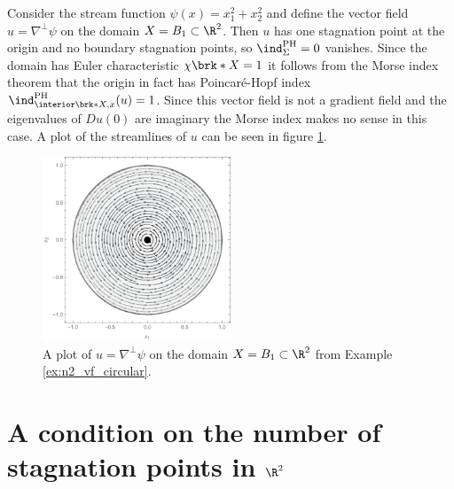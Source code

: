 \begin{example}\label{ex:n2_vf_circular}
  Consider the stream function $\psi(x)=x_1^2+x_2^2$ and define the vector field $u=\nabla^\perp\psi$ on the domain $X=B_1\subset\R^2$.
  Then $u$ has one stagnation point at the origin and no boundary stagnation points, so $\ind^\text{PH}_\Sigma=0$ vanishes.
  Since the domain has Euler characteristic $\chi\brk*{X}=1$ it follows from the Morse index theorem
  that the origin in fact has Poincaré-Hopf index $\ind^\text{PH}_{\interior\brk*{X},x}(u)=1$.
  Since this vector field is not a gradient field and the eigenvalues of $Du(0)$ are imaginary the Morse index makes no sense in
  this case.
  A plot of the streamlines of $u$ can be seen in figure \ref{pl:n2_vf_circular}.
  \begin{figure}
    \centering
    \includegraphics[width=0.5\textwidth]{../Plots/n2_vf_circular.pdf}
    \caption{A plot of $u=\nabla^\perp\psi$ on the domain $X=B_1\subset\R^2$ from Example \ref{ex:n2_vf_circular}.}
    \label{pl:n2_vf_circular}
  \end{figure}
\end{example}

\section{A condition on the number of stagnation points in $\R^2$}

